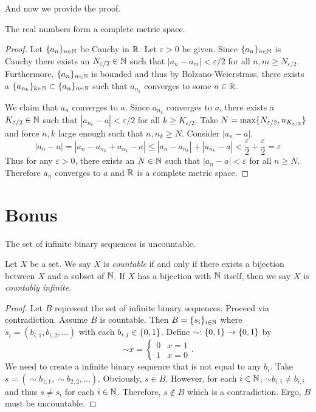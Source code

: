 \documentclass[notitlepage]{simple}
\begin{document}
And now we provide the proof.

\begin{thm}
	The real numbers form a complete metric space.
\end{thm}
\begin{proof}
	Let $\lbrace a_n \rbrace_{n\in\mathbb{N}}$ be Cauchy in $\mathbb{R}$.
	Let $\varepsilon > 0$ be given.
	Since $\lbrace a_n \rbrace_{n\in\mathbb{N}}$ is Cauchy there exists an $N_{\varepsilon/2}\in\mathbb{N}$ such that $|a_n-a_m|<\varepsilon/2$ for all $n,m\geq N_{\varepsilon/2}$.
	Furthermore, $\lbrace a_n \rbrace_{n\in\mathbb{N}}$ is bounded and thus by Bolzano-Weierstrass, there exists a $\lbrace a_{n_k} \rbrace_{k\in\mathbb{N}}\subset\lbrace a_n \rbrace_{n\in\mathbb{N}}$ such that $a_{n_k}$ converges to some $a\in\mathbb{R}$.

	We claim that $a_n$ converges to $a$.
	Since $a_{n_k}$ converges to $a$, there exists a $K_{\varepsilon/2}\in\mathbb{N}$ such that $|a_{n_k}-a|<\varepsilon/2$ for all $k\geq K_{\varepsilon/2}$.
	Take $N=\max\lbrace N_{\varepsilon/2},n_{K_{\varepsilon/2}} \rbrace$ and force $n,k$ large enough such that $n,n_k\geq N$.
	Consider $|a_n-a|$.
	\[
		|a_n-a|=|a_n-a_{n_k}+a_{n_k}-a|\leq |a_n-a_{n_k}|+|a_{n_k}-a|<\frac{\varepsilon}{2}+\frac{\varepsilon}{2}=\varepsilon
	\]
	Thus for any $\varepsilon >0$, there exists an $N\in\mathbb{N}$ such that $|a_n-a|<\varepsilon$ for all $n\geq N$.
	Therefore $a_n$ converges to $a$ and $\mathbb{R}$ is a complete metric space.
\end{proof}

\section{Bonus}

\begin{thm*}
	The set of infinite binary sequences is uncountable.
\end{thm*}

\begin{definition}
	Let $X$ be a set.
	We say $X$ is \textit{countable} if and only if there exists a bijection between $X$ and a subset of $\mathbb{N}$.
	If $X$ has a bijection with $\mathbb{N}$ itself, then we say $X$ is \textit{countably infinite}.
\end{definition}

\begin{proof}
	Let $B$ represent the set of infinite binary sequences.
	Proceed via contradiction.
	Assume $B$ is countable.
	Then $B=\lbrace s_i \rbrace_{i\in\mathbb{N}}$ where $s_i=(b_{i,1},b_{i,2},\ldots)$ with each $b_{i,j}\in\lbrace 0,1 \rbrace$.
	Define $\sim:\lbrace 0,1 \rbrace\rightarrow\lbrace 0,1 \rbrace$ by
	\[
		\sim x=
		\begin{cases}
			0 & x=1\\
			1 & x=0
		\end{cases}.
	\]
	We need to create a infinite binary sequence that is not equal to any $b_i$.
	Take $s=(\sim b_{1,1},\sim b_{2,2},\ldots)$.
	Obviously, $s\in B$.
	However, for each $i\in\mathbb{N}$, $\sim b_{i,i}\neq b_{i,i}$ and thus $s\neq s_i$ for each $i\in\mathbb{N}$.
	Therefore, $s\notin B$ which is a contradiction.
	Ergo, $B$ must be uncountable.
\end{proof}
\end{document}
